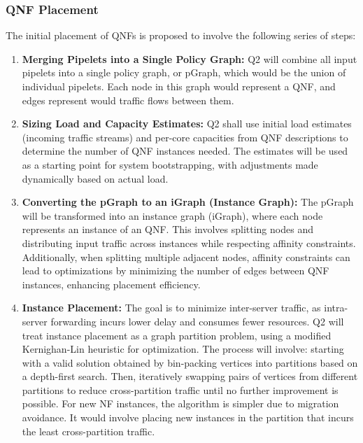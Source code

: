 \documentclass[sigplan,screen]{acmart}
\begin{document}
\subsubsection{QNF Placement}
The initial placement of QNFs is proposed to involve the following series of steps:
\begin{enumerate}
    \item \textbf{Merging Pipelets into a Single Policy Graph:} Q2 will combine all input pipelets into a single policy graph, or pGraph, which would be the union of individual pipelets. Each node in this graph would represent a QNF, and edges represent would traffic flows between them.
    \item \textbf{Sizing Load and Capacity Estimates:} Q2 shall use initial load estimates (incoming traffic streams) and per-core capacities from QNF descriptions to determine the number of QNF instances needed. The estimates will be used as a starting point for system bootstrapping, with adjustments made dynamically based on actual load.
    \item \textbf{Converting the pGraph to an iGraph (Instance Graph):} The pGraph will be transformed into an instance graph (iGraph), where each node represents an instance of an QNF. This involves splitting nodes and distributing input traffic across instances while respecting affinity constraints. Additionally, when splitting multiple adjacent nodes, affinity constraints can lead to optimizations by minimizing the number of edges between QNF instances, enhancing placement efficiency.
    \item \textbf{Instance Placement:} The goal is to minimize inter-server traffic, as intra-server forwarding incurs lower delay and consumes fewer resources.
    Q2  will treat instance placement as a graph partition problem, using a modified Kernighan-Lin heuristic for optimization. The process will involve: starting with a valid solution obtained by bin-packing vertices into partitions based on a depth-first search. Then, iteratively swapping pairs of vertices from different partitions to reduce cross-partition traffic until no further improvement is possible. 
    For new NF instances, the algorithm is simpler due to migration avoidance. It would involve placing new instances in the partition that incurs the least cross-partition traffic.
\end{enumerate}
\end{document}
